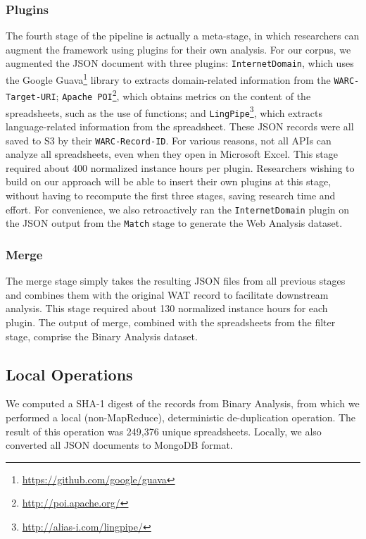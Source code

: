 \documentclass[conference]{IEEEtran}
\begin{document}
\subsubsection{Plugins} 

The fourth stage of the pipeline is actually a meta-stage, in which researchers can augment the framework using plugins for their own analysis. For our corpus, we augmented the JSON document with three plugins: \texttt{InternetDomain}, which uses the Google Guava\footnote{\url{https://github.com/google/guava}} library to extracts domain-related information from the \texttt{WARC-Target-URI}; \texttt{Apache POI}\footnote{\url{http://poi.apache.org/}}, which obtains metrics on the content of the spreadsheets, such as the use of functions; and \texttt{LingPipe}\footnote{\url{http://alias-i.com/lingpipe/}}, which extracts language-related information from the spreadsheet. These JSON records were all saved to S3 by their \texttt{WARC-Record-ID}. For various reasons, not all APIs can analyze all spreadsheets, even when they open in Microsoft Excel. This stage required about 400 normalized instance hours per plugin. Researchers wishing to build on our approach will be able to insert their own plugins at this stage, without having to recompute the first three stages, saving research time and effort. For convenience, we also retroactively ran the \texttt{InternetDomain} plugin on the JSON output from the \texttt{Match} stage to generate the Web Analysis dataset.

\subsubsection{Merge} 

The merge stage simply takes the resulting JSON files from all previous stages and combines them with the original WAT record to facilitate downstream analysis. This stage required about 130 normalized instance hours for each plugin. The output of merge, combined with the spreadsheets from the filter stage, comprise the Binary Analysis dataset.

\subsection{Local Operations}


We computed a SHA-1 digest of the records from Binary Analysis, from which we performed a local (non-MapReduce), deterministic de-duplication operation. The result of this operation was 249,376 unique spreadsheets. Locally, we also converted all JSON documents to MongoDB format.
\end{document}
